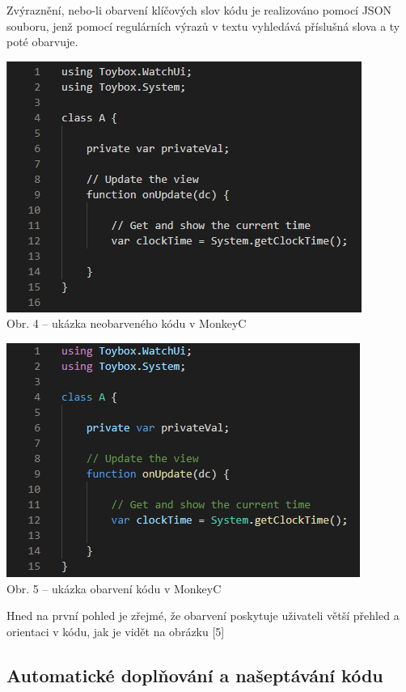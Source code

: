 \documentclass[czech,master,dept460,male,cpp,cpdeclaration]{diploma}
\begin{document}
Zvýraznění, nebo-li obarvení klíčových slov kódu je realizováno pomocí JSON souboru, jenž pomocí regulárních výrazů v textu vyhledává příslušná slova a ty poté obarvuje.
\\
\begin{center}
	\includegraphics[]{uncolored_code}
	\\
	Obr. 4 – ukázka neobarveného kódu v MonkeyC
\end{center}

\begin{center}

	\includegraphics[]{colored_code}
	\\
	Obr. 5 – ukázka obarvení kódu v MonkeyC
\end{center}
	
Hned na první pohled je zřejmé, že obarvení poskytuje uživateli větší přehled a orientaci v kódu, jak je vidět na obrázku [5]


\subsection{Automatické doplňování a našeptávání kódu}
\end{document}
